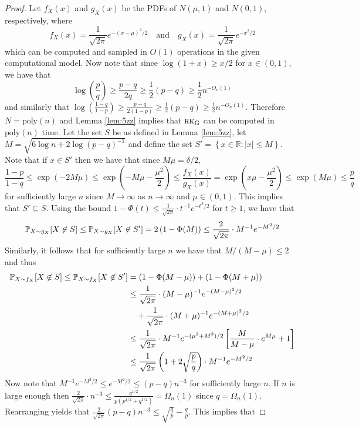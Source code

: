 \begin{proof}
Let $f_X(x)$ and $g_X(x)$ be the PDFs of $N(\mu, 1)$ and $N(0, 1)$, respectively, where
$$f_X(x) = \frac{1}{\sqrt{2\pi}} e^{-(x - \mu)^2/2} \quad \text{and} \quad g_X(x) = \frac{1}{\sqrt{2\pi}} e^{-x^2/2}$$
which can be computed and sampled in $O(1)$ operations in the given computational model. Now note that since $\log(1 + x) \ge x/2$ for $x \in (0, 1)$, we have that
$$\log \left( \frac{p}{q} \right) \ge \frac{p - q}{2q} \ge \frac{1}{2}(p - q) \ge \frac{1}{2} n^{-O_n(1)}$$
and similarly that $\log\left( \frac{1 - q}{1 - p} \right) \ge \frac{p - q}{2(1 - p)} \ge \frac{1}{2}(p - q) \ge \frac{1}{2} n^{-O_n(1)}$. Therefore $N = \text{poly}(n)$ and Lemma \ref{lem:5zz} implies that $\textsc{rk}_{\text{G}}$ can be computed in $\text{poly}(n)$ time. Let the set $S$ be as defined in Lemma \ref{lem:5zz}, let $M = \sqrt{6 \log n + 2\log(p - q)^{-1}}$ and define the set $S' = \left\{ x \in \mathbb{R} : |x| \le M \right\}$. Note that if $x \in S'$ then we have that since $M\mu = \delta/2$,
$$\frac{1 - p}{1 - q} \le \exp\left( - 2M\mu \right) \le \exp\left( -M \mu - \frac{\mu^2}{2} \right) \le \frac{f_X(x)}{g_X(x)} = \exp\left( x\mu - \frac{\mu^2}{2} \right) \le \exp\left( M \mu \right) \le \frac{p}{q}$$
for sufficiently large $n$ since $M \to \infty$ as $n \to \infty$ and $\mu \in (0, 1)$. This implies that $S' \subseteq S$. Using the bound $1 - \Phi(t) \le \frac{1}{\sqrt{2\pi}} \cdot t^{-1} e^{-t^2/2}$ for $t \ge 1$, we have that
$$\mathbb{P}_{X \sim g_X}[X \not \in S] \le \mathbb{P}_{X \sim g_X}[X \not \in S'] = 2\left(1 - \Phi(M) \right) \le \frac{2}{\sqrt{2\pi}} \cdot M^{-1} e^{-M^2/2}$$
Similarly, it follows that for sufficiently large $n$ we have that $M/(M - \mu) \le 2$ and thus
\begin{align*}
\mathbb{P}_{X \sim f_X}[X \not \in S] \le \mathbb{P}_{X \sim f_X}[X \not \in S'] &= \left(1 - \Phi(M - \mu) \right) + \left(1 - \Phi(M + \mu) \right) \\
&\le \frac{1}{\sqrt{2\pi}} \cdot (M - \mu)^{-1} e^{-(M - \mu)^2/2} \\
&\quad + \frac{1}{\sqrt{2\pi}} \cdot (M + \mu)^{-1} e^{-(M + \mu)^2/2} \\
&\le \frac{1}{\sqrt{2\pi}} \cdot M^{-1} e^{-(\mu^2 + M^2)/2} \left[ \frac{M}{M - \mu} \cdot e^{M\mu} + 1 \right] \\
&\le \frac{1}{\sqrt{2\pi}} \left( 1 + 2\sqrt{\frac{p}{q}} \right) \cdot M^{-1} e^{-M^2/2}
\end{align*}
Now note that $M^{-1} e^{-M^2/2} \le e^{-M^2/2} \le (p - q)n^{-3}$ for sufficiently large $n$. If $n$ is large enough then $\frac{2}{\sqrt{2\pi}} \cdot n^{-3} \le \frac{q^{1/2}}{p(p^{1/2} + q^{1/2})} = \Omega_n(1)$ since $q = \Omega_n(1)$. Rearranging yields that $\frac{2}{\sqrt{2\pi}} (p - q) n^{-3} \le \sqrt{\frac{q}{p}} - \frac{q}{p}$. This implies that

\end{proof}
